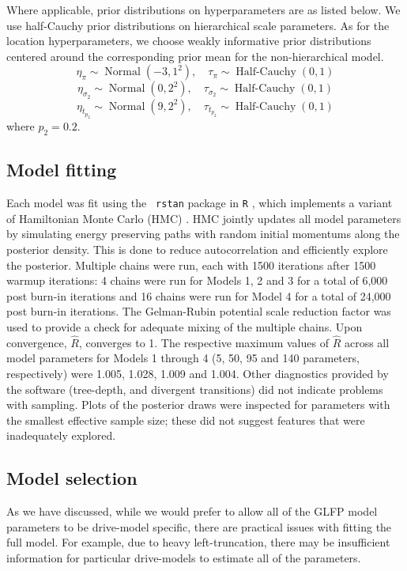 \documentclass[11pt]{article}
\newcommand{\op}{\operatorname}
\begin{document}
Where applicable, prior distributions on hyperparameters are as listed below. We use half-Cauchy prior distributions on hierarchical scale parameters. As for the location hyperparameters, we choose weakly informative prior distributions centered around the corresponding prior mean for the non-hierarchical model.
$$\eta_{\pi} \sim \op{Normal}(-3, 1^2),\quad \tau_{\pi} \sim \op{Half-Cauchy}(0, 1)$$
$$\eta_{\sigma_2}  \sim \op{Normal}(0, 2^2),\quad
\tau_{\sigma_2}  \sim \op{Half-Cauchy}(0, 1)$$
$$\eta_{t_{p_2}}  \sim \op{Normal}(9, 2^2),\quad
\tau_{t_{p_2}}  \sim \op{Half-Cauchy}(0, 1)$$
where $p_{2}=0.2$.

\subsection{Model fitting}
\label{sec:Model fitting}
Each model was fit using the {\tt
  rstan} \citep{rstan} package in {\tt R} \citep{r}, which implements a variant of Hamiltonian Monte Carlo (HMC)
\citep{betancourt}. HMC jointly updates all model parameters by simulating energy preserving paths with random initial momentums along the posterior density. This is done to reduce autocorrelation and efficiently explore the posterior. Multiple chains were run, each with 1500 iterations after 1500 warmup iterations: 4 chains were run for Models 1, 2 and 3 for a total of 6,000 post burn-in iterations and 16 chains were run for Model 4 for a total of 24,000 post burn-in iterations. The Gelman-Rubin potential scale reduction factor was used to provide a check for adequate mixing of the multiple chains. Upon convergence, $\hat{R}$, converges to 1.  The  respective maximum values of $\hat{R}$ across all model parameters for Models 1 through 4 (5, 50, 95 and 140 parameters, respectively) were 1.005, 1.028, 1.009 and 1.004. Other diagnostics provided by the software (tree-depth, and divergent transitions) did not indicate problems with sampling. Plots of the posterior draws were inspected for parameters with the smallest effective sample size; these did not suggest features that were inadequately explored.



\subsection{Model selection}
\label{sec:Model Comparisons}
As we have discussed, while we would prefer to allow all of the GLFP model parameters to be drive-model specific, there are practical issues with fitting the full model. For example, due to heavy left-truncation, there may be insufficient information for particular drive-models to estimate all of the parameters. 
\end{document}
